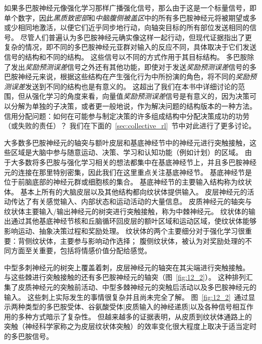 如果多巴胺神经元像强化学习那样广播强化信号，那么由于这是一个标量信号，即单个数字，因此\textit{黑质致密部}和\textit{中脑腹侧被盖区}中的所有多巴胺神经元将被期望或多或少相同地激活，以便它们近乎同步地行动，向轴突目标的所有部位发送相同的信号。 
尽管人们普遍认为多巴胺神经元确实像这样一起行动，但现代证据指出了更复杂的情况，即不同的多巴胺神经元亚群对输入的反应不同，具体取决于它们发送信号的结构和不同的结构。
这些信号以不同的方式作用于其目标结构。
多巴胺除了发出\textit{奖励预测误差}信号之外还有其他功能，即使对于发送\textit{奖励预测误差}信号的多巴胺神经元来说，根据这些结构在产生强化行为中所扮演的角色，将不同的\textit{奖励预测误差}发送到不同的结构也是有意义的。
这超出了我们在本书中详细讨论的范围，但从强化学习的角度来看，向量值\textit{奖励预测误差}信号是有意义的，因为决策可以分解为单独的子决策，或者更一般地说，作为解决问题的结构版本的一种方法。
信用分配问题：如何在可能参与制定决策的许多组成结构中分配决策成功的功劳（或失败的责任）？
我们在下面的~\ref{sec:collective_rl}~节中对此进行了更多讨论。


大多数多巴胺神经元的轴突与额叶皮层和基底神经节中的神经元进行突触接触，这些区域是大脑中参与随意运动、决策、学习和认知功能（例如计划）的区域。
由于大多数将多巴胺与强化学习相关的想法都集中在基底神经节上，并且多巴胺神经元的连接在那里特别密集，因此我们在这里重点关注基底神经节。
基底神经节是位于前脑底部的神经元群或细胞核的集合。 基底神经节的主要输入结构称为纹状体。
基本上所有的大脑皮层以及其他结构都向纹状体提供输入。
皮层神经元的活动传达了有关感觉输入、内部状态和运动活动的大量信息。
皮质神经元的轴突与纹状体主要输入/输出神经元的树突进行突触接触，称为中棘神经元。
纹状体的输出通过其他基底神经节核和丘脑循环回皮层的额叶区域和运动区域，使纹状体能够影响运动、抽象决策过程和奖励处理。
纹状体的两个主要细分对于强化学习很重要：背侧纹状体，主要参与影响动作选择；
腹侧纹状体，被认为对奖励处理的不同方面至关重要，包括将情感价值分配给感觉。



中型多刺神经元的树突上覆盖着刺，皮层神经元的轴突在其尖端进行突触接触。
与这些棘进行突触接触的还有多巴胺神经元的轴突（图~\ref{fig:12_2}）。
这种排列汇集了皮质神经元的突触前活动、中型多棘神经元的突触后活动以及多巴胺神经元的输入。
这些刺上实际发生的事情很复杂并且尚未完全了解。
图~\ref{fig:12_2}~通过显示两种类型的多巴胺受体、谷氨酸受体|皮质输入的神经递质|以及各种信号相互作用的多种方式暗示了复杂性。
但越来越多的证据表明，从皮质到纹状体通路上的突触（神经科学家称之为皮层纹状体突触）的效率变化很大程度上取决于适当定时的多巴胺信号。



